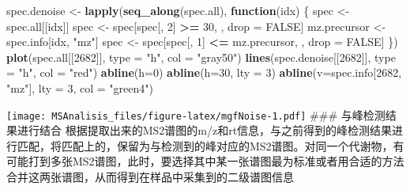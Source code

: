 \documentclass[]{ctexbook}
\newenvironment{Shaded}{\begin{snugshade}}{\end{snugshade}}
\newcommand{\ControlFlowTok}[1]{\textcolor[rgb]{0.13,0.29,0.53}{\textbf{#1}}}
\newcommand{\DataTypeTok}[1]{\textcolor[rgb]{0.13,0.29,0.53}{#1}}
\newcommand{\DecValTok}[1]{\textcolor[rgb]{0.00,0.00,0.81}{#1}}
\newcommand{\KeywordTok}[1]{\textcolor[rgb]{0.13,0.29,0.53}{\textbf{#1}}}
\newcommand{\NormalTok}[1]{#1}
\newcommand{\OperatorTok}[1]{\textcolor[rgb]{0.81,0.36,0.00}{\textbf{#1}}}
\newcommand{\OtherTok}[1]{\textcolor[rgb]{0.56,0.35,0.01}{#1}}
\newcommand{\StringTok}[1]{\textcolor[rgb]{0.31,0.60,0.02}{#1}}
\begin{document}
\begin{Shaded}
\begin{Highlighting}[]
\NormalTok{spec.denoise <-}\StringTok{ }\KeywordTok{lapply}\NormalTok{(}\KeywordTok{seq_along}\NormalTok{(spec.all), }\ControlFlowTok{function}\NormalTok{(idx) \{}
\NormalTok{  spec <-}\StringTok{ }\NormalTok{spec.all[[idx]]}
\NormalTok{  spec <-}\StringTok{ }\NormalTok{spec[spec[, }\DecValTok{2}\NormalTok{] }\OperatorTok{>=}\StringTok{ }\DecValTok{30}\NormalTok{, , drop =}\StringTok{ }\OtherTok{FALSE}\NormalTok{]}
\NormalTok{  mz.precursor <-}\StringTok{ }\NormalTok{spec.info[idx, }\StringTok{"mz"}\NormalTok{]}
\NormalTok{  spec <-}\StringTok{ }\NormalTok{spec[spec[, }\DecValTok{1}\NormalTok{] }\OperatorTok{<=}\StringTok{ }\NormalTok{mz.precursor, , drop =}\StringTok{ }\OtherTok{FALSE}\NormalTok{]}
\NormalTok{\})}
\KeywordTok{plot}\NormalTok{(spec.all[[}\DecValTok{2682}\NormalTok{]], }\DataTypeTok{type =} \StringTok{"h"}\NormalTok{, }\DataTypeTok{col =} \StringTok{"gray50"}\NormalTok{)}
\KeywordTok{lines}\NormalTok{(spec.denoise[[}\DecValTok{2682}\NormalTok{]], }\DataTypeTok{type =} \StringTok{"h"}\NormalTok{, }\DataTypeTok{col =} \StringTok{"red"}\NormalTok{)}
\KeywordTok{abline}\NormalTok{(}\DataTypeTok{h=}\DecValTok{0}\NormalTok{)}
\KeywordTok{abline}\NormalTok{(}\DataTypeTok{h=}\DecValTok{30}\NormalTok{, }\DataTypeTok{lty =} \DecValTok{3}\NormalTok{)}
\KeywordTok{abline}\NormalTok{(}\DataTypeTok{v=}\NormalTok{spec.info[}\DecValTok{2682}\NormalTok{, }\StringTok{"mz"}\NormalTok{], }\DataTypeTok{lty =} \DecValTok{3}\NormalTok{, }\DataTypeTok{col =} \StringTok{"green4"}\NormalTok{)}
\end{Highlighting}
\end{Shaded}

\texttt{[image: MSAnalisis\_files/figure-latex/mgfNoise-1.pdf]}
\#\#\# 与峰检测结果进行结合
根据提取出来的MS2谱图的m/z和rt信息，与之前得到的峰检测结果进行匹配，将匹配上的，保留为与检测到的峰对应的MS2谱图。对同一个代谢物，有可能打到多张MS2谱图，此时，要选择其中某一张谱图最为标准或者用合适的方法合并这两张谱图，从而得到在样品中采集到的二级谱图信息
\end{document}
